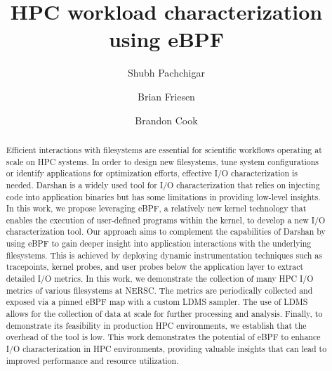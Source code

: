 \documentclass[sigconf]{acmart}
\begin{document}
\title{HPC workload characterization using eBPF}


\author{Shubh Pachchigar}

\author{Brian Friesen}

\author{Brandon Cook}
\renewcommand{\shortauthors}{Pachchigar et al.}

\begin{abstract}

Efficient interactions with filesystems are essential for scientific workflows operating at scale on HPC systems.
In order to design new filesystems, tune system configurations or identify applications for optimization efforts, effective I/O characterization is needed.
Darshan is a widely used tool for I/O characterization that relies on injecting code into application binaries but has some limitations in providing low-level insights.
In this work, we propose leveraging eBPF, a relatively new kernel technology that enables the execution of user-defined programs within the kernel, to develop a new I/O characterization tool. Our approach aims to complement the capabilities of Darshan by using eBPF to gain deeper insight into application interactions with the underlying filesystems. This is achieved by deploying dynamic instrumentation techniques such as tracepoints, kernel probes, and user probes below the application layer to extract detailed I/O metrics.
In this work, we demonstrate the collection of many HPC I/O metrics of various filesystems at NERSC.
The metrics are periodically collected and exposed via a pinned eBPF map with a custom LDMS sampler.
The use of LDMS allows for the collection of data at scale for further processing and analysis.
Finally, to demonstrate its feasibility in production HPC environments, we establish that the overhead of the tool is low.
This work demonstrates the potential of eBPF to enhance I/O characterization in HPC environments, providing valuable insights that can lead to improved performance and resource utilization.

\end{abstract}
\end{document}
